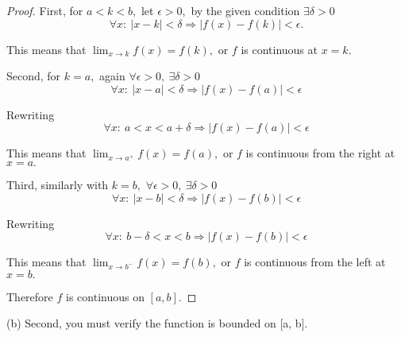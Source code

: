 \documentclass{article}
\begin{document}
\begin{proof}
    First, for $a < k <b,$ let $\epsilon > 0,$ by the given condition $\exists \delta > 0$
    \[
        \forall x:\ |x-k| < \delta \Rightarrow |f(x) - f(k)| < \epsilon.
    \]
    
    This means that $\lim_{x \rightarrow k} f(x) = f(k),$ or $f$ is continuous at $x=k.$

    Second, for $k=a,$ again $\forall \epsilon > 0,\ \exists \delta > 0$
    \[
        \forall x:\ |x-a| < \delta \Rightarrow |f(x) - f(a)| < \epsilon
    \]

    Rewriting 
    \[
        \forall x:\ a < x < a + \delta \Rightarrow |f(x) - f(a)| < \epsilon
    \]

    This means that $\lim_{x \rightarrow a^{+}} f(x) = f(a),$ or $f$ is continuous from the right at $x=a.$

    Third, similarly with $k=b,$ $\forall \epsilon > 0,\ \exists \delta > 0$
    \[
        \forall x:\ |x-b| < \delta \Rightarrow |f(x) - f(b)| < \epsilon
    \]

    Rewriting 
    \[
        \forall x:\ b - \delta < x < b \Rightarrow |f(x) - f(b)| < \epsilon
    \]

    This means that $\lim_{x \rightarrow b^{-}} f(x) = f(b),$ or $f$ is continuous from the left at $x = b.$

    Therefore $f$ is continuous on $[a, b].$
\end{proof}

\newpage

\begin{problem*}[3b]
    (b) Second, you must verify the function is bounded on [a, b].
\end{problem*}
\end{document}
